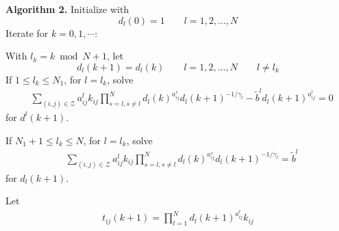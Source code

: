 \documentclass[twocolumn]{article}
\begin{document}
{\bf Algorithm 2.}
Initialize with
 \[
d_l(0) = 1\qquad l=1,2,\dots, N 
\]
Iterate for $k=0,1, \cdots$:

With  $l_k = k\bmod N +1$, let
\begin{equation}
\label{eq:dlkp1}
d_l(k+1) =d_l(k)  \qquad  l=1,2,\dots, N \qquad  l\neq l_k
    \end{equation}
 If $1 \le l_k \le N_1$, for $l=l_k$,
solve
\begin{equation}
\begin{aligned}
\label{eq:dlGen}
 &\sum_{(i,j) \in {\mathcal Z}} {a^l_{ij}}k_{ij}   \prod_{s=l, s\neq l}^Nd_{l}(k)^{a^s_{ij}} d_{l}(k+1)^{-1/\gamma_l} 
 - \tilde{b}^l   d_{l}(k+1)^{a^l_{ij}} =0
 \end{aligned}
\end{equation}
for $d^l(k+1)$.


If $N_1+1 \le l_k \le N$, for $l=l_k$,
solve
\begin{equation}
\begin{aligned}
\label{eq:dlGen}
 &\sum_{(i,j) \in {\mathcal Z}} {a^l_{ij}}k_{ij}   \prod_{s=l, s\neq l}^Nd_{l}(k)^{a^s_{ij}} d_{l}(k+1)^{-1/\gamma_l} 
 = \tilde{b}^l   
 \end{aligned}
\end{equation}
for $d_l(k+1)$.

Let
\begin{equation}
\begin{aligned}
t_{ij}(k+1) = \prod_{l=1}^Nd_{l}(k+1)^{a^l_{ij}} k_{ij}  \\
\end{aligned}
\end{equation}


\end{document}

